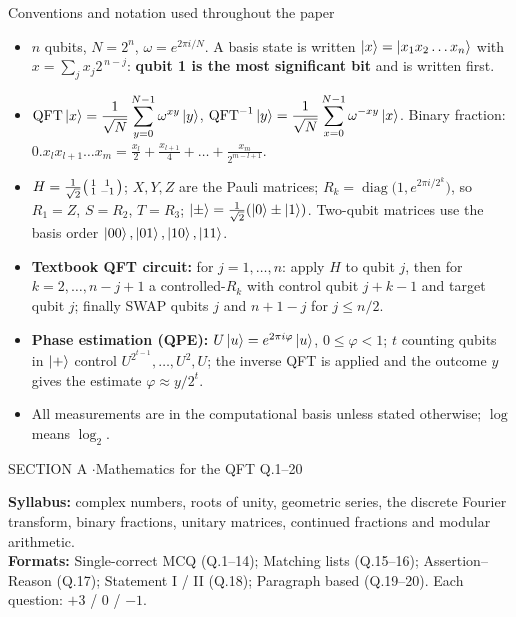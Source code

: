 \documentclass[11pt,a4paper]{article}
\begin{document}
\begin{infobox}{Conventions and notation used throughout the paper}
\small
\begin{itemize}[leftmargin=1.2em, itemsep=1pt, topsep=2pt]
\item $n$ qubits, $N = 2^n$, $\omega = e^{2\pi i/N}$. A basis state is written $\ket{x} = \ket{x_1x_2\dots x_n}$ with
      $x = \sum_{j} x_j 2^{\,n-j}$: \textbf{qubit 1 is the most significant bit} and is written first.
\item $\displaystyle \mathrm{QFT}\ket{x} = \frac{1}{\sqrt N}\sum_{y=0}^{N-1}\omega^{xy}\ket{y}$, \quad
      $\displaystyle \mathrm{QFT}^{-1}\ket{y} = \frac{1}{\sqrt N}\sum_{x=0}^{N-1}\omega^{-xy}\ket{x}$.
      Binary fraction: $0.x_lx_{l+1}\dots x_m = \frac{x_l}{2} + \frac{x_{l+1}}{4} + \dots + \frac{x_m}{2^{m-l+1}}$.
\item $H = \frac{1}{\sqrt2}\begin{psmallmatrix}1&1\\1&-1\end{psmallmatrix}$; $X, Y, Z$ are the Pauli matrices;
      $R_k = \operatorname{diag}\big(1, e^{2\pi i/2^k}\big)$, so $R_1 = Z$, $S = R_2$, $T = R_3$;
      $\ket{\pm} = \frac{1}{\sqrt2}(\ket0 \pm \ket1)$. Two-qubit matrices use the basis order $\ket{00}, \ket{01}, \ket{10}, \ket{11}$.
\item \textbf{Textbook QFT circuit:} for $j = 1, \dots, n$: apply $H$ to qubit $j$, then for $k = 2, \dots, n-j+1$ a controlled-$R_k$
      with control qubit $j+k-1$ and target qubit $j$; finally SWAP qubits $j$ and $n+1-j$ for $j \le n/2$.
\item \textbf{Phase estimation (QPE):} $U\ket{u} = e^{2\pi i\varphi}\ket{u}$, $0 \le \varphi < 1$; $t$ counting qubits in $\ket{+}$ control
      $U^{2^{t-1}}, \dots, U^{2}, U$; the inverse QFT is applied and the outcome $y$ gives the estimate $\varphi \approx y/2^t$.
\item All measurements are in the computational basis unless stated otherwise; $\log$ means $\log_2$.
\end{itemize}
\end{infobox}
\newpage

\begin{sectionbanner}SECTION A \enspace$\cdot$\enspace Mathematics for the QFT \hfill Q.1--20\end{sectionbanner}

{\small \textbf{Syllabus:} complex numbers, roots of unity, geometric series, the discrete Fourier transform, binary fractions, unitary matrices, continued fractions and modular arithmetic.\\ \textbf{Formats:} Single-correct MCQ (Q.1--14); Matching lists (Q.15--16); Assertion--Reason (Q.17); Statement I / II (Q.18); Paragraph based (Q.19--20). Each question: $+3$ / $0$ / $-1$.}
\par\medskip
\end{document}
